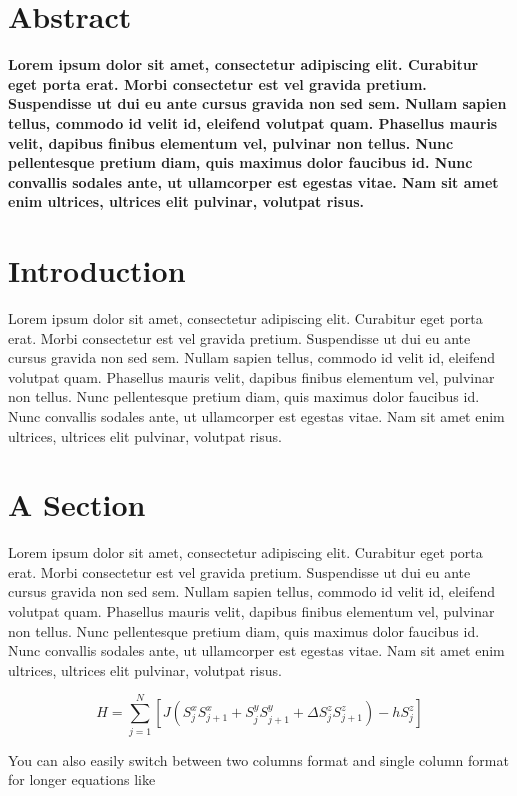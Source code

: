 \documentclass[10pt]{article}
\begin{document}
\begin{multicols}{2}

\section*{Abstract}
{\bf 
Lorem ipsum dolor sit amet, consectetur adipiscing elit. Curabitur eget porta erat. Morbi consectetur est vel gravida pretium. Suspendisse ut dui eu ante cursus gravida non sed sem. Nullam sapien tellus, commodo id velit id, eleifend volutpat quam. Phasellus mauris velit, dapibus finibus elementum vel, pulvinar non tellus. Nunc pellentesque pretium diam, quis maximus dolor faucibus id. Nunc convallis sodales ante, ut ullamcorper est egestas vitae. Nam sit amet enim ultrices, ultrices elit pulvinar, volutpat risus.
}

\section{Introduction}
Lorem ipsum dolor sit amet\cite{Cite1}, consectetur adipiscing elit. Curabitur eget porta erat. Morbi consectetur est vel gravida pretium. Suspendisse ut dui eu ante cursus gravida non sed sem. Nullam sapien tellus, commodo id velit id, eleifend volutpat quam. Phasellus mauris velit, dapibus finibus elementum vel, pulvinar non tellus. Nunc pellentesque pretium diam, quis maximus dolor faucibus id. Nunc convallis sodales ante, ut ullamcorper est egestas vitae. Nam sit amet enim ultrices, ultrices elit pulvinar, volutpat risus.

\section{A Section}
Lorem ipsum dolor sit amet, consectetur adipiscing elit. Curabitur eget porta erat. Morbi consectetur est vel gravida pretium. Suspendisse ut dui eu ante cursus gravida non sed sem. Nullam sapien tellus, commodo id velit id, eleifend volutpat quam. Phasellus mauris velit, dapibus finibus elementum vel, pulvinar non tellus. Nunc pellentesque pretium diam, quis maximus dolor faucibus id. Nunc convallis sodales ante, ut ullamcorper est egestas vitae. Nam sit amet enim ultrices, ultrices elit pulvinar, volutpat risus.

\begin{equation}
H = \sum_{j=1}^N \left[J (S^x_j S^x_{j+1} + S^y_j S^y_{j+1} + \Delta S^z_j S^z_{j+1}) - h S^z_j \right]
\end{equation}

You can also easily switch between two columns format and single column format for longer equations like
\end{multicols}
\end{document}
